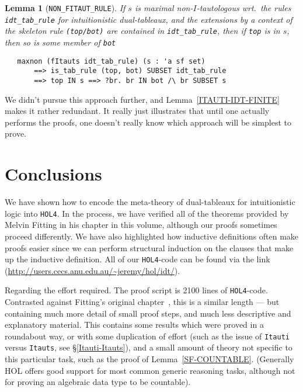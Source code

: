 \documentclass[a4paper]{article}
\newtheorem{lemma}{Lemma}
\newcommand{\hol}{\texttt{HOL4}}
\begin{document}
\begin{lemma}[\texttt{NON\_FITAUT\_RULE}]

  If $s$ is maximal non-$I$-tautologous wrt.\ the rules \texttt{idt\_tab\_rule}
  for intuitionistic dual-tableaux, 
  and the extensions by a context of the skeleton rule
  \texttt{(top/bot)} are contained
  in \texttt{idt\_tab\_rule}, then if \texttt{top} is in $s$,
  then so is some member of \texttt{bot} 

\begin{verbatim}
   maxnon (fItauts idt_tab_rule) (s : 'a sf set) 
       ==> is_tab_rule (top, bot) SUBSET idt_tab_rule 
       ==> top IN s ==> ?br. br IN bot /\ br SUBSET s
\end{verbatim}
\end{lemma}

We didn't pursue this approach further,
and Lemma~\ref{ITAUTI-IDT-FINITE} 
makes it rather redundant.
It really just illustrates that until one actually performs the proofs,
one doesn't really know which approach will be simplest to prove.

\section{Conclusions}

We have shown how to encode the meta-theory of dual-tableaux for
intuitionistic logic into \hol. In the process, we have verified all
of the theorems provided by Melvin Fitting in his chapter in this
volume, although our proofs sometimes proceed differently. We have
also highlighted how inductive definitions often make proofs easier
since we can perform structural induction on the clauses that make up
the inductive definition. All of our \hol-code
can be found via the link (\url{http://users.cecs.anu.edu.au/~jeremy/hol/idt/}).

Regarding the effort required. 
The proof script is {2100} lines of \hol-code.
Contrasted against Fitting's original
chapter~\cite{fitting-dual-tableau}, this is a similar length --- 
but containing much more detail of small proof steps, and much less descriptive
and explanatory material.
This contains some results which were proved in a roundabout way, or with
some duplication of effort (such as the issue of \texttt{Itauti} versus
\texttt{Itauts}, see \S\ref{Itauti-Itauts}),
and a small amount of theory not specific to this particular task,
such as the proof of Lemma~\ref{SF-COUNTABLE}.
(Generally HOL offers good support for most common generic reasoning tasks, 
although not for proving an algebraic data type to be countable).
\end{document}

